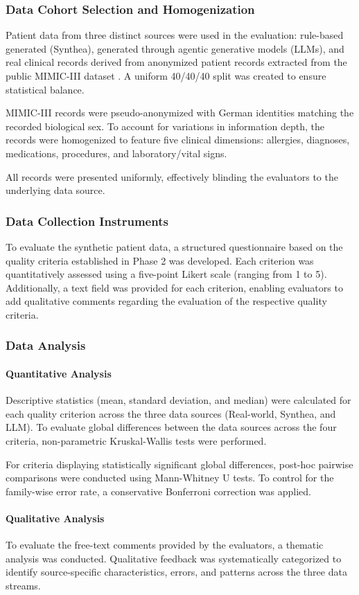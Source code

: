 \subsubsection*{Data Cohort Selection and Homogenization}
\label{subsubsec:data_cohort_selection}
Patient data from three distinct sources were used in the evaluation: rule-based generated (Synthea), generated through agentic generative models (LLMs), and real clinical records derived from anonymized patient records extracted from the public MIMIC-III dataset \citep{mimiciii-1.4}. A uniform 40/40/40 split was created to ensure statistical balance.

MIMIC-III records were pseudo-anonymized with German identities matching the recorded biological sex. To account for variations in information depth, the records were homogenized to feature five clinical dimensions: allergies, diagnoses, medications, procedures, and laboratory/vital signs.

All records were presented uniformly, effectively blinding the evaluators to the underlying data source.

\subsubsection*{Data Collection Instruments}
\label{subsubsec:data_collection_instruments}

To evaluate the synthetic patient data, a structured questionnaire based on the quality criteria established in Phase 2 was developed. Each criterion was quantitatively assessed using a five-point Likert scale (ranging from 1 to 5). Additionally, a text field was provided for each criterion, enabling evaluators to add qualitative comments regarding the evaluation of the respective quality criteria.

\subsubsection{Data Analysis}
\label{subsubsec:data_analysis}

\paragraph{Quantitative Analysis}
Descriptive statistics (mean, standard deviation, and median) were calculated for each quality criterion across the three data sources (Real-world, Synthea, and LLM). To evaluate global differences between the data sources across the four criteria, non-parametric Kruskal-Wallis tests were performed.

For criteria displaying statistically significant global differences, post-hoc pairwise comparisons were conducted using Mann-Whitney U tests. To control for the family-wise error rate, a conservative Bonferroni correction was applied.

\paragraph{Qualitative Analysis}
To evaluate the free-text comments provided by the evaluators, a thematic analysis was conducted. Qualitative feedback was systematically categorized to identify source-specific characteristics, errors, and patterns across the three data streams.
